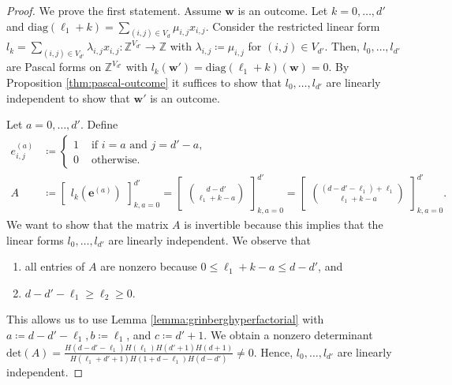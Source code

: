 \begin{proof}
    We prove the first statement. Assume \( \mathbf{w} \) is an outcome. Let \( k = 0, \dots, d' \) and \( \mathrm{diag}(\ell_1 + k) = \sum_{(i,j) \in V_d} \mu_{i,j} x_{i,j} \). Consider the restricted linear form \( l_k = \sum_{(i,j) \in V_{d'}} \lambda_{i,j}x_{i,j} : \mathbb{Z}^{V_{d'}} \to \mathbb{Z} \) with \( \lambda_{i,j} \coloneqq \mu_{i,j} \) for \( (i,j) \in V_{d'} \). Then, \( l_0, \dots, l_{d'} \) are Pascal forms on \( \mathbb{Z}^{V_{d'}} \) with \( l_k(\mathbf{w}') = \mathrm{diag}(\ell_1 + k)(\mathbf{w}) = 0 \). By Proposition \ref{thm:pascal-outcome} it suffices to show that \( l_0, \dots, l_{d'} \) are linearly independent to show that \( \mathbf{w}' \) is an outcome.

    Let \( a = 0, \dots, d' \). Define
    \begin{align*}
        e_{{i,j}}^{(a)} &\coloneqq \begin{cases}
            1 & \text{ if } i = a \text{ and } j = d' - a, \\
            0 & \text{ otherwise}.
        \end{cases}\\
        A &\coloneqq \begin{bmatrix}
            l_k(\mathbf{e}^{(a)})
        \end{bmatrix}^{d'}_{k,a = 0} = \begin{bmatrix}
            \binom{d-d'}{\ell_1 + k - a}
        \end{bmatrix}^{d'}_{k,a = 0} = \begin{bmatrix}
            \binom{(d-d' - \ell_1) + \ell_1}{\ell_1 + k - a}
        \end{bmatrix}^{d'}_{k,a = 0}.
    \end{align*}
    We want to show that the matrix \( A \) is invertible because this implies that the linear forms \( l_0, \dots, l_{d'} \) are linearly independent. We observe that 
    \begin{enumerate}
        \item all entries of \( A \) are nonzero because \( 0 \leq \ell_1 + k - a \leq d - d' \), and 
        \item \( d - d' - \ell_1 \geq \ell_2 \geq 0 \).
    \end{enumerate}
    This allows us to use Lemma \ref{lemma:grinberghyperfactorial} with \( a \coloneqq d - d' - \ell_1, b \coloneqq \ell_1\), and \( c \coloneqq d' + 1 \).
    We obtain a nonzero determinant \( \mathrm{det}(A) = \frac{H(d - d' - \ell_1)H(\ell_1)H(d' + 1)H(d+1)}{H(\ell_1 + d' + 1)H(1 + d - \ell_1)H(d - d')} \neq 0 \).
    Hence, \( l_0, \dots, l_{d'} \) are linearly independent.


\end{proof}

